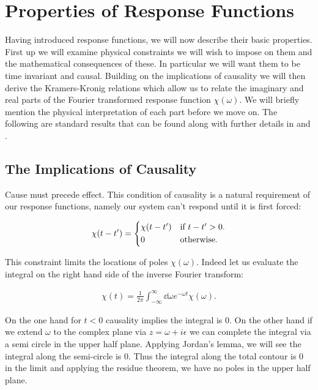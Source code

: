 \section{Properties of Response Functions}

Having introduced response functions, we will now describe their basic properties. First up we will examine physical constraints we will wish to impose on them and the mathematical consequences of these. In particular we will want them to be time invariant and causal. Building on the implications of causality we will then derive the Kramers-Kronig relations which allow us to relate the imaginary and real parts of the Fourier transformed response function $\chi(\omega)$. We will briefly mention the physical interpretation of each part before we move on. The following are standard results that can be found along with further details in \cite{LiviPoliti2017} and \cite{Reichl1999}.

\subsection{The Implications of Causality}

Cause must precede effect. This condition of causality is a natural requirement of our response functions, namely our system can't respond until it is first forced:

\begin{align}
\chi(t - t') = 
\begin{cases*}
\chi(t - t') & if $t -t' > 0$.\\
0 & otherwise.
\end{cases*}
\end{align}

\noindent This constraint limits the locations of poles $\chi(\omega)$. Indeed let us evaluate the integral on the right hand side of the inverse Fourier transform:

\begin{align}
\chi(t) = \frac{1}{2 \pi} \int_{-\infty}^{\infty} \dd \omega e^{- \omega t} \chi (\omega).
\end{align}

\noindent On the one hand for $t<0$ causality implies the integral is $0$. On the other hand if we extend $\omega$ to the complex plane via $ z = \omega + i \epsilon$ we can complete the integral via a semi circle in the upper half plane. Applying Jordan's lemma, we will see the integral along the semi-circle is $0$. Thus the integral along the total contour is $0$ in the limit and applying the residue theorem, we have no poles in the upper half plane.

